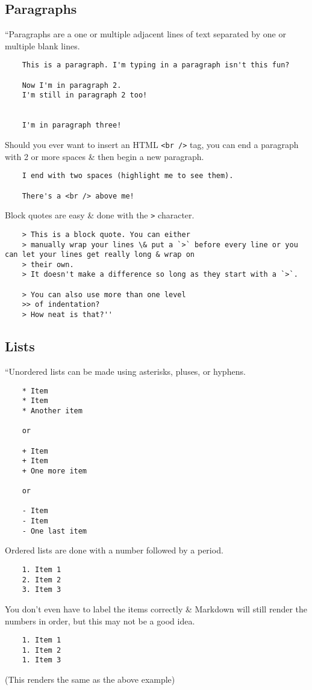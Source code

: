 \documentclass[oneside]{book}
\numberwithin{equation}{section}
\begin{document}
\subsection{Paragraphs}
``Paragraphs are a one or multiple adjacent lines of text separated by one or multiple blank lines.
\begin{verbatim}
	This is a paragraph. I'm typing in a paragraph isn't this fun?
	
	Now I'm in paragraph 2.
	I'm still in paragraph 2 too!
	
	
	I'm in paragraph three!
\end{verbatim}
Should you ever want to insert an HTML \verb|<br />| tag, you can end a paragraph with 2 or more spaces \& then begin a new paragraph.
\begin{verbatim}
	I end with two spaces (highlight me to see them).
	
	There's a <br /> above me!
\end{verbatim}
Block quotes are easy \& done with the \texttt{>} character.
\begin{verbatim}
	> This is a block quote. You can either
	> manually wrap your lines \& put a `>` before every line or you can let your lines get really long & wrap on
	> their own.
	> It doesn't make a difference so long as they start with a `>`.
	
	> You can also use more than one level
	>> of indentation?
	> How neat is that?''
\end{verbatim}

\subsection{Lists}
``Unordered lists can be made using asterisks, pluses, or hyphens.
\begin{verbatim}
	* Item
	* Item
	* Another item
	
	or
	
	+ Item
	+ Item
	+ One more item
	
	or
	
	- Item
	- Item
	- One last item
\end{verbatim}
Ordered lists are done with a number followed by a period.
\begin{verbatim}
	1. Item 1
	2. Item 2
	3. Item 3
\end{verbatim}
You don't even have to label the items correctly \& Markdown will still render the numbers in order, but this may not be a good idea.
\begin{verbatim}
	1. Item 1
	1. Item 2
	1. Item 3
\end{verbatim}
(This renders the same as the above example)
\end{document}
